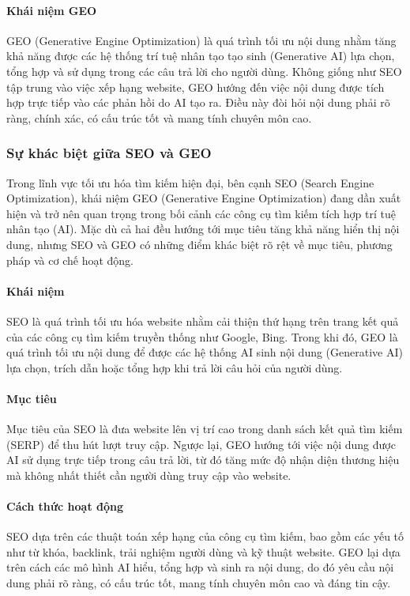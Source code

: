 \documentclass[13pt]{article}
\begin{document}
\paragraph{Khái niệm GEO}
GEO (Generative Engine Optimization) là quá trình tối ưu nội dung nhằm tăng khả năng được các hệ thống trí tuệ nhân tạo tạo sinh (Generative AI) lựa chọn, tổng hợp và sử dụng trong các câu trả lời cho người dùng. Không giống như SEO tập trung vào việc xếp hạng website, GEO hướng đến việc nội dung được tích hợp trực tiếp vào các phản hồi do AI tạo ra. Điều này đòi hỏi nội dung phải rõ ràng, chính xác, có cấu trúc tốt và mang tính chuyên môn cao.


\subsubsection{Sự khác biệt giữa SEO và GEO}

Trong lĩnh vực tối ưu hóa tìm kiếm hiện đại, bên cạnh SEO (Search Engine Optimization), khái niệm GEO (Generative Engine Optimization) đang dần xuất hiện và trở nên quan trọng trong bối cảnh các công cụ tìm kiếm tích hợp trí tuệ nhân tạo (AI). Mặc dù cả hai đều hướng tới mục tiêu tăng khả năng hiển thị nội dung, nhưng SEO và GEO có những điểm khác biệt rõ rệt về mục tiêu, phương pháp và cơ chế hoạt động.

\paragraph{Khái niệm}
SEO là quá trình tối ưu hóa website nhằm cải thiện thứ hạng trên trang kết quả của các công cụ tìm kiếm truyền thống như Google, Bing. Trong khi đó, GEO là quá trình tối ưu nội dung để được các hệ thống AI sinh nội dung (Generative AI) lựa chọn, trích dẫn hoặc tổng hợp khi trả lời câu hỏi của người dùng.

\paragraph{Mục tiêu}
Mục tiêu của SEO là đưa website lên vị trí cao trong danh sách kết quả tìm kiếm (SERP) để thu hút lượt truy cập. Ngược lại, GEO hướng tới việc nội dung được AI sử dụng trực tiếp trong câu trả lời, từ đó tăng mức độ nhận diện thương hiệu mà không nhất thiết cần người dùng truy cập vào website.

\paragraph{Cách thức hoạt động}
SEO dựa trên các thuật toán xếp hạng của công cụ tìm kiếm, bao gồm các yếu tố như từ khóa, backlink, trải nghiệm người dùng và kỹ thuật website. GEO lại dựa trên cách các mô hình AI hiểu, tổng hợp và sinh ra nội dung, do đó yêu cầu nội dung phải rõ ràng, có cấu trúc tốt, mang tính chuyên môn cao và đáng tin cậy.
\end{document}
